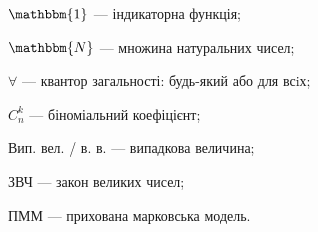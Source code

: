 $\mathbbm{1}$ --- індикаторна функція;

$\mathbbm{N}$ --- множина натуральних чисел;

$\forall$ --- квантор загальності: будь-який або для всiх;

$C^k_n$ --- біноміальний коефіцієнт;

Вип. вел. / в. в. --- випадкова величина;

ЗВЧ --- закон великих чисел;

ПММ --- прихована марковська модель.